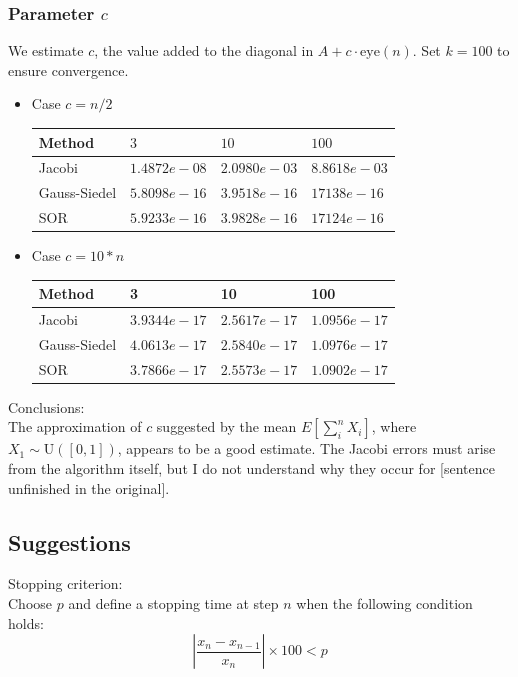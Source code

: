 \documentclass[a4paper, 11pt]{article}
\begin{document}
\subsubsection{Parameter $c$}
We estimate \( c \), the value added to the diagonal in \( A + c \cdot \text{eye}(n) \). Set \( k = 100 \) to ensure convergence.
\begin{itemize}
    \item Case $c = n/2$
\begin{center}
\begin{tabular}{|l|l|l|l|}
\hline
Method       & $3$            & $10$           & $100$          \\ \hline
Jacobi       & $1.4872e-08$ & $2.0980e-03$ & $8.8618e-03$ \\ \hline
Gauss-Siedel & $5.8098e-16$ & $3.9518e-16$ & $17138e-16$  \\ \hline
SOR          & $5.9233e-16$ & $3.9828e-16$ & $17124e-16$  \\ \hline
\end{tabular}
\end{center}
    \item Case $c = 10*n$
    \begin{center}
\begin{tabular}{|l|l|l|l|}
\hline
Method       & 3            & 10           & 100          \\ \hline
Jacobi       & $3.9344e-17$ & $2.5617e-17$ & $1.0956e-17$ \\ \hline
Gauss-Siedel & $4.0613e-17$ & $2.5840e-17$ & $1.0976e-17$ \\ \hline
SOR          & $3.7866e-17$ & $2.5573e-17$ & $1.0902e-17$ \\ \hline
\end{tabular}
    \end{center}
\end{itemize}
Conclusions:\\
The approximation of $c$ suggested by the mean $E[\sum_i^n X_i]$, where $X_1 \sim \mathrm{U}([0, 1])$, appears to be a good estimate. The Jacobi errors must arise from the algorithm itself, but I do not understand why they occur for [sentence unfinished in the original].
\subsection{Suggestions}
Stopping criterion:\\
Choose $p$ and define a stopping time at step $n$ when the following condition holds:
$$\left|\frac{x_n - x_{n-1}}{x_n}\right| \times 100 < p$$
\end{document}
